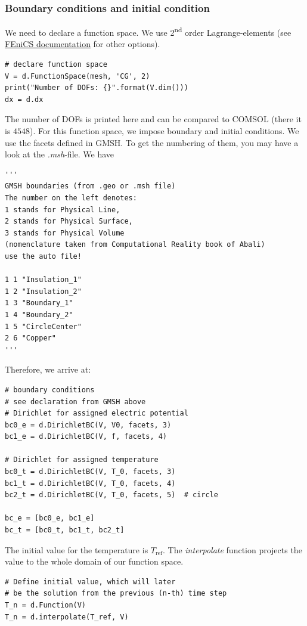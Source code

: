 \documentclass{article}
\begin{document}
\subsubsection{Boundary conditions and initial condition}
We need to declare a function space.
We use 2\textsuperscript{nd} order Lagrange-elements (see \href{https://fenicsproject.org/olddocs/dolfin/1.4.0/python/programmers-reference/functions/functionspace/FunctionSpace.html}{FEniCS documentation} for other options).
\begin{lstlisting}
# declare function space
V = d.FunctionSpace(mesh, 'CG', 2)
print("Number of DOFs: {}".format(V.dim()))
dx = d.dx
\end{lstlisting}
The number of DOFs is printed here and can be compared to COMSOL (there it is $4548$).
For this function space, we impose boundary and initial conditions. 
We use the facets defined in GMSH.
To get the numbering of them, you may have a look at the \textit{.msh}-file.
We have
\begin{lstlisting}
'''
GMSH boundaries (from .geo or .msh file)
The number on the left denotes:
1 stands for Physical Line, 
2 stands for Physical Surface, 
3 stands for Physical Volume
(nomenclature taken from Computational Reality book of Abali)
use the auto file!

1 1 "Insulation_1"
1 2 "Insulation_2"
1 3 "Boundary_1"
1 4 "Boundary_2"
1 5 "CircleCenter"
2 6 "Copper"
'''
\end{lstlisting}
Therefore, we arrive at:
\begin{lstlisting}
# boundary conditions
# see declaration from GMSH above
# Dirichlet for assigned electric potential
bc0_e = d.DirichletBC(V, V0, facets, 3)
bc1_e = d.DirichletBC(V, f, facets, 4)

# Dirichlet for assigned temperature
bc0_t = d.DirichletBC(V, T_0, facets, 3)
bc1_t = d.DirichletBC(V, T_0, facets, 4)
bc2_t = d.DirichletBC(V, T_0, facets, 5)  # circle

bc_e = [bc0_e, bc1_e]
bc_t = [bc0_t, bc1_t, bc2_t]
\end{lstlisting}
The initial value for the temperature is $T_\mathrm{ref}$.
The \textit{interpolate} function projects the value to the whole domain of our function space.
\begin{lstlisting}
# Define initial value, which will later
# be the solution from the previous (n-th) time step
T_n = d.Function(V)
T_n = d.interpolate(T_ref, V)
\end{lstlisting}
\end{document}
